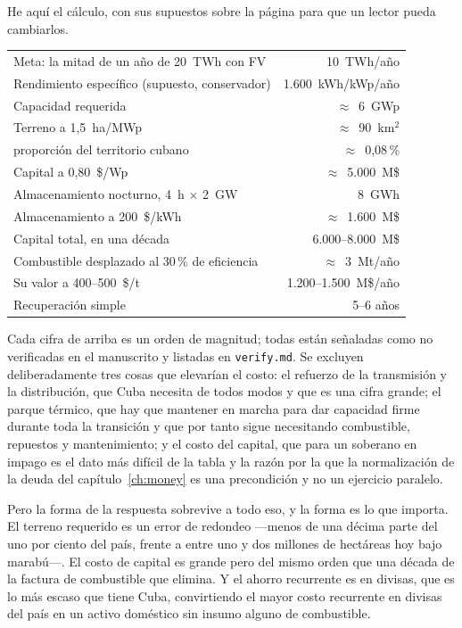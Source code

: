 He aquí el cálculo, con sus supuestos sobre la página para que un lector pueda
cambiarlos.

\begin{center}
\footnotesize
\begin{tabular}{@{}L{2.35in}r@{}}
\toprule
Meta: la mitad de un año de 20~TWh con FV & 10~TWh/año \\
Rendimiento específico (supuesto, conservador) & 1{.}600~kWh/kWp/año \\
\midrule
Capacidad requerida & $\approx$~6~GWp \\
Terreno a 1,5~ha/MWp & $\approx$~90~km$^2$ \\
\quad proporción del territorio cubano & $\approx$~0,08\,\% \\
Capital a 0,80~\$/Wp & $\approx$~5.000~M\$ \\
Almacenamiento nocturno, 4~h $\times$ 2~GW & 8~GWh \\
Almacenamiento a 200~\$/kWh & $\approx$~1.600~M\$ \\
\midrule
Capital total, en una década & 6.000--8.000~M\$ \\
Combustible desplazado al 30\,\% de eficiencia & $\approx$~3~Mt/año \\
Su valor a 400--500~\$/t & 1.200--1.500~M\$/año \\
\midrule
Recuperación simple & 5--6 años \\
\bottomrule
\end{tabular}
\end{center}

\noindent Cada cifra de arriba es un orden de magnitud; todas están señaladas
como no verificadas en el manuscrito y listadas en \texttt{verify.md}. Se
excluyen deliberadamente tres cosas que elevarían el costo:
el refuerzo de la transmisión y la distribución, que Cuba necesita de todos modos y que
es una cifra grande; el parque térmico, que hay que mantener en marcha para dar
capacidad firme durante toda la transición y que por tanto sigue necesitando
combustible, repuestos y mantenimiento; y el costo del capital, que para un soberano en
impago es el dato más difícil de la tabla y la razón por la que la normalización de la
deuda del capítulo~\ref{ch:money} es una precondición y no un ejercicio paralelo.

Pero la forma de la respuesta sobrevive a todo eso, y la forma es lo que importa. El
terreno requerido es un error de redondeo ---menos de una décima parte del uno por
ciento del país, frente a entre uno y dos millones de hectáreas hoy bajo marabú---. El
costo de capital es grande pero del mismo orden que una década de la factura de
combustible que elimina. Y el ahorro recurrente es en divisas, que es lo más escaso que
tiene Cuba, convirtiendo el mayor costo recurrente en divisas del país en un activo
doméstico sin insumo alguno de combustible.


